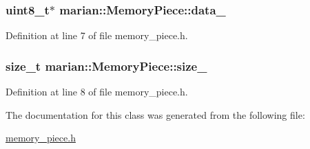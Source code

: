 \subsubsection[{\texorpdfstring{data\+\_\+}{data_}}]{\setlength{\rightskip}{0pt plus 5cm}uint8\+\_\+t$\ast$ marian\+::\+Memory\+Piece\+::data\+\_\+\hspace{0.3cm}{\ttfamily [private]}}\hypertarget{classmarian_1_1MemoryPiece_a0188dc58e2d25a29d98fa40d4ebaabe2}{}\label{classmarian_1_1MemoryPiece_a0188dc58e2d25a29d98fa40d4ebaabe2}


Definition at line 7 of file memory\+\_\+piece.\+h.

\subsubsection[{\texorpdfstring{size\+\_\+}{size_}}]{\setlength{\rightskip}{0pt plus 5cm}size\+\_\+t marian\+::\+Memory\+Piece\+::size\+\_\+\hspace{0.3cm}{\ttfamily [private]}}\hypertarget{classmarian_1_1MemoryPiece_ae7822b5a7f733156ccab1a40de674831}{}\label{classmarian_1_1MemoryPiece_ae7822b5a7f733156ccab1a40de674831}


Definition at line 8 of file memory\+\_\+piece.\+h.



The documentation for this class was generated from the following file\+:\begin{DoxyCompactItemize}
\item 
\hyperlink{memory__piece_8h}{memory\+\_\+piece.\+h}\end{DoxyCompactItemize}
